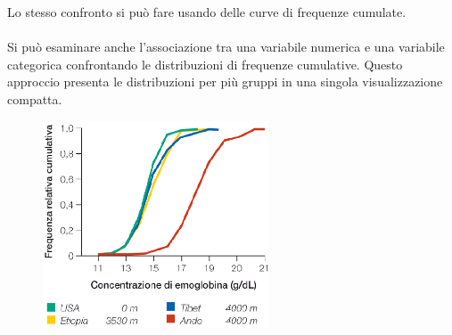 \documentclass[10pt, draft]{book}
\begin{document}
Lo stesso confronto si può fare usando delle curve di frequenze cumulate.
\\
\\
Si può esaminare anche l'associazione tra una variabile numerica e una variabile categorica confrontando le distribuzioni di frequenze cumulative. Questo approccio presenta le distribuzioni per più gruppi in una singola visualizzazione compatta.
    \begin{figure}[h]\label{fig2.4-2}
    \centering
    \includegraphics[width=0.6\textwidth]{fig2.4-2}
    \caption{\small{}}
    \end{figure}
\end{document}
